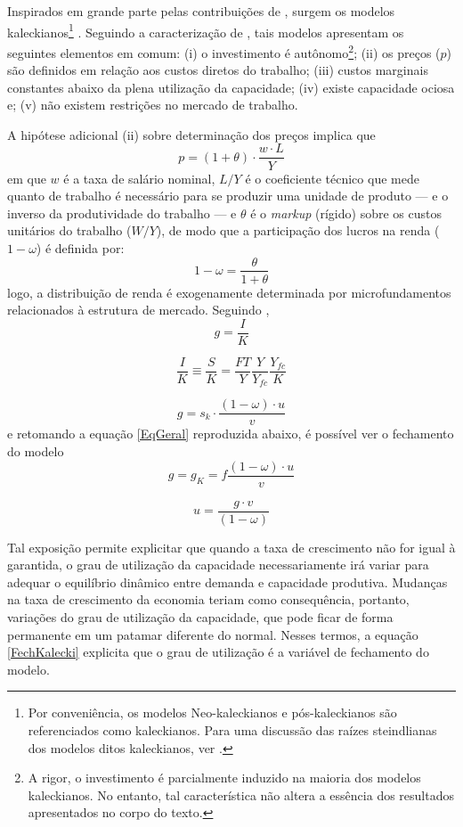 Inspirados em grande parte pelas contribuições de \textcite{steindl_stagnation_1979}, surgem os modelos kaleckianos\footnote{Por conveniência, os modelos Neo-kaleckianos e pós-kaleckianos são referenciados como kaleckianos. Para uma discussão das raízes steindlianas dos modelos ditos kaleckianos, ver \textcite{santiago_uma_2008}.
} \cites{rowthorn_demand_1981}{dutt_stagnation_1984}{taylor_stagnationist_1985}{amadeo_role_1986}{bhaduri_unemployment_1990}. Seguindo a caracterização de \textcite[p.~790]{lavoie_kaleckian_1995}, tais modelos apresentam os seguintes elementos em comum: (i) o investimento é autônomo\footnote{
	A rigor, o investimento é parcialmente induzido na maioria dos modelos kaleckianos. No entanto, tal característica não altera  a essência dos resultados apresentados no corpo do texto.
}; (ii) os preços ($p$) são definidos em relação aos custos diretos do trabalho; (iii) custos marginais constantes abaixo da plena utilização da capacidade; (iv) existe capacidade ociosa e; (v) não existem restrições no mercado de trabalho. 

A hipótese adicional (ii) sobre determinação dos preços implica que 
$$
p = (1+\theta)\cdot \frac{w\cdot L}{Y}
$$
em que $w$ é a taxa de salário nominal, $L/Y$ é o coeficiente técnico que mede quanto de trabalho é necessário para se produzir uma unidade de produto --- e o inverso da produtividade do trabalho --- e $\theta$ é o \textit{markup} (rígido) sobre os custos unitários do trabalho ($W/Y$),  de modo que a participação dos lucros na renda ($1-\omega$) é definida por:
$$
1 - \omega = \frac{\theta}{1+\theta}
$$
logo, a distribuição de renda é exogenamente determinada por microfundamentos relacionados à estrutura de mercado. 
Seguindo \textcite{serrano_trouble_2017},
$$
g = \frac{I}{K}
$$

$$
\frac{I}{K} \equiv \frac{S}{K} =  \frac{FT}{Y}\frac{Y}{Y_{fc}}\frac{Y_{fc}}{K}
$$

$$
g = s_k\cdot \frac{(1-\omega)\cdot u}{ v}
$$
e retomando a equação \ref{EqGeral} reproduzida abaixo, é possível ver o fechamento do modelo
$$
g = g_K = f\frac{(1-\omega)\cdot u}{v}
$$

\begin{equation}
\label{FechKalecki}
u = \frac{g\cdot v}{(1-\omega)}
\end{equation}

Tal exposição permite explicitar que quando a taxa de crescimento não for igual à garantida, o grau de utilização da capacidade necessariamente irá variar para adequar o equilíbrio dinâmico entre demanda e capacidade produtiva.
Mudanças na taxa de crescimento da economia teriam como consequência, portanto, variações do grau de utilização da capacidade, que pode ficar de forma permanente em um patamar diferente do normal.
Nesses termos, a equação \ref{FechKalecki} explicita que o grau de utilização é a variável de fechamento do modelo.

